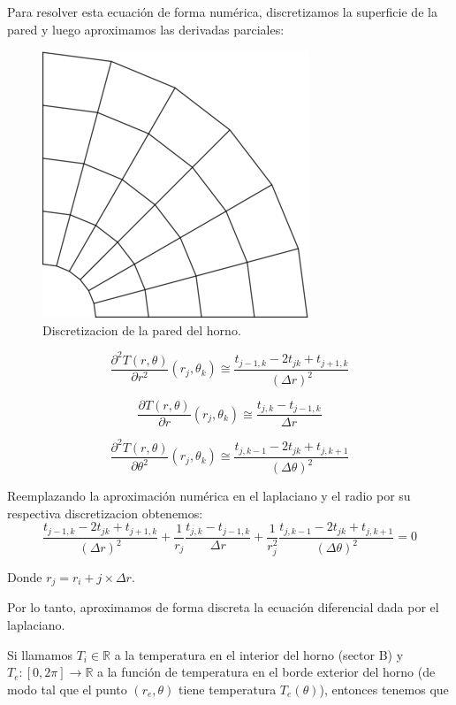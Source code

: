 Para resolver esta ecuación de forma numérica, discretizamos la superficie de la pared y luego aproximamos las derivadas parciales:

\begin{figure}[ht]
\begin{center}
\includegraphics[width=0.2\columnwidth]{catedra/disc.png}
\caption{Discretizacion de la pared del horno.}
\end{center}
\end{figure}

\begin{equation}
\frac{\partial^2T(r,\theta)}{\partial r^2}(r_j,\theta_k) \cong \frac{t_{j-1,k}-2t_{jk}+t_{j+1,k}}{(\Delta r)^2}
\end{equation}

\begin{equation}
\frac{\partial T(r,\theta)}{\partial r}(r_j,\theta_k) \cong \frac{t_{j,k}-t_{j-1,k}}{\Delta r}
\end{equation}

\begin{equation}
\frac{\partial^2T(r,\theta)}{\partial \theta^2}(r_j,\theta_k) \cong \frac{t_{j,k-1}-2t_{jk}+t_{j,k+1}}{(\Delta \theta)^2}
\end{equation}

Reemplazando la aproximación numérica en el laplaciano y el radio por su respectiva discretizacion obtenemos:
\begin{equation}\label{calor}
\frac{t_{j-1,k}-2t_{jk}+t_{j+1,k}}{(\Delta r)^2}
+ \frac{1}{r_j}
\frac{t_{j,k}-t_{j-1,k}}{\Delta r}
+
\frac{1}{r_j^2}
\frac{t_{j,k-1}-2t_{jk}+t_{j,k+1}}{(\Delta \theta)^2} = 0 \nonumber
\end{equation}

Donde $r_j = r_i + j \times \Delta r$.

Por lo tanto, aproximamos de forma discreta la ecuación diferencial dada por el laplaciano.


Si llamamos $T_i \in \mathbb{R}$ a la temperatura en el interior del horno (sector B) y $T_e : [0,2\pi] \rightarrow \mathbb{R}$ a la función de temperatura en el borde exterior del horno (de modo tal que el punto $(r_e,\theta)$ tiene temperatura $T_e(\theta)$), entonces tenemos que

